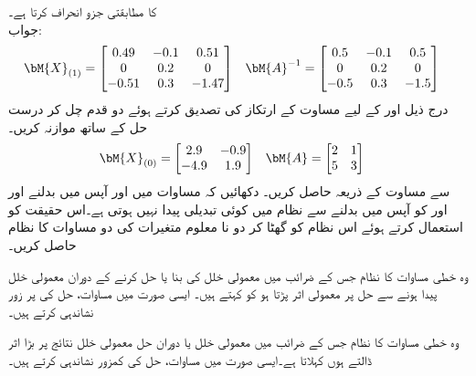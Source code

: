   کا مطابقتی جزو   انحراف کرتا ہے۔\\
جواب:
\begin{align*}
\bM{X}_{(1)}&=
\begin{bmatrix} 0.49&-0.1&0.51\\0&0.2&0\\-0.51&0.3&-1.47 \end{bmatrix} &
\bM{A}^{-1}&=\begin{bmatrix} 0.5&-0.1&0.5\\ 0&0.2&0\\ -0.5&0.3&-1.5 \end{bmatrix}
\end{align*}
\quad
درج ذیل  اور   کے لیے مساوت  کے ارتکاز کی تصدیق کرتے ہوئے  دو قدم چل کر درست حل کے ساتھ موازنہ کریں۔
\begin{align*}
\bM{X}_{(0)}&=\begin{bmatrix} 2.9& -0.9\\-4.9&1.9 \end{bmatrix} &
\bM{A}&=\begin{bmatrix} 2&1\\ 5&3 \end{bmatrix}
\end{align*}
\quad
{} سے مساوت  کے ذریعہ  حاصل کریں۔
\quad
دکھائیں کہ مساوات  میں  اور  آپس میں بدلنے اور  اور  کو آپس میں بدلنے سے نظام میں کوئی تبدیلی پیدا نہیں ہوتی ہے۔اس حقیقت کو استعمال کرتے ہوئے اس نظام کو گھٹا کر دو نا معلوم متغیرات کی دو مساوات کا نظام حاصل کریں۔

وہ خطی مساوات کا نظام جس کے  ضرائب  میں معمولی خلل کی بنا یا حل کرنے کے دوران معمولی خلل پیدا ہونے سے حل پر معمولی اثر پڑتا ہو کو  کہتے ہیں۔ ایسی صورت میں مساوات، حل کی پر زور نشاندہی کرتے ہیں۔

وہ خطی مساوات کا نظام جس کے ضرائب  میں معمولی خلل یا دوران حل معمولی خلل نتائج پر بڑا اثر ڈالتے ہوں  کہلاتا ہے۔ایسی صورت میں مساوات، حل کی کمزور نشاندہی کرتے ہیں۔

